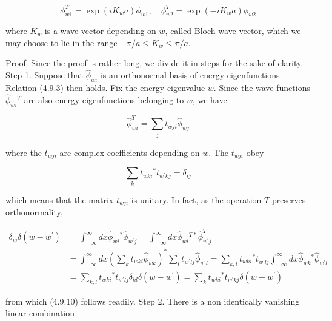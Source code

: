 \documentclass{article}
\begin{document}
\begin{equation*}
\phi_{w 1}^{T}=\exp \left(i K_{w} a\right) \phi_{w 1}, \quad \phi_{w 2}^{T}=\exp \left(-i K_{w} a\right) \phi_{w 2} \tag{4.9.8}
\end{equation*}
 
where $K_{w}$ is a wave vector depending on $w$, called Bloch wave vector, which we may choose to lie in the range $-\pi / a \leq K_{w} \leq \pi / a$.

Proof. Since the proof is rather long, we divide it in steps for the sake of clarity.
Step 1. Suppose that $\hat{\phi}_{w i}$ is an orthonormal basis of energy eigenfunctions. Relation (4.9.3) then holds. Fix the energy eigenvalue $w$. Since the wave functions $\hat{\phi}_{w i}{ }^{T}$ are also energy eigenfunctions belonging to $w$, we have
 
\begin{equation*}
\hat{\phi}_{w i}^{T}=\sum_{j} t_{w j i} \hat{\phi}_{w j} \tag{4.9.9}
\end{equation*}
 
where the $t_{w j i}$ are complex coefficients depending on $w$. The $t_{w j i}$ obey
 
\begin{equation*}
\sum_{k} t_{w k i}{ }^{*} t_{w^{\prime} k j}=\delta_{i j} \tag{4.9.10}
\end{equation*}
 
which means that the matrix $t_{w j i}$ is unitary. In fact, as the operation $T$ preserves orthonormality,
 
\begin{align*}
\delta_{i j} \delta\left(w-w^{\prime}\right) & =\int_{-\infty}^{\infty} d x \hat{\phi}_{w i}{ }^{*} \hat{\phi}_{w^{\prime} j}=\int_{-\infty}^{\infty} d x \hat{\phi}_{w i}{ }^{T *} \hat{\phi}_{w^{\prime} j}^{T}  \tag{4.9.11}\\
& =\int_{-\infty}^{\infty} d x\left(\sum_{k} t_{w k i} \hat{\phi}_{w k}\right)^{*} \sum_{l} t_{w^{\prime} l j} \hat{\phi}_{w^{\prime} l}=\sum_{k, l} t_{w k i}{ }^{*} t_{w^{\prime} l j} \int_{-\infty}^{\infty} d x \hat{\phi}_{w k}{ }^{*} \hat{\phi}_{w^{\prime} l} \\
& =\sum_{k, l} t_{w k i}{ }^{*} t_{w^{\prime} l j} \delta_{k l} \delta\left(w-w^{\prime}\right)=\sum_{k} t_{w k i}{ }^{*} t_{w^{\prime} k j} \delta\left(w-w^{\prime}\right)
\end{align*}
 
from which (4.9.10) follows readily.
Step 2. There is a non identically vanishing linear combination
 
\end{document}
